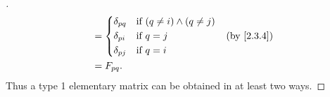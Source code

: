 \begin{proof}[]
\begin{align*}
		                                            & = \begin{dcases}
			                                                \delta_{p q} & \text{if } (q \neq i) \land (q \neq j) \\
			                                                \delta_{p i} & \text{if } q = j                       \\
			                                                \delta_{p j} & \text{if } q = i
		                                                \end{dcases}    &  & \by{2.3.4}    \\
		                                            & = F_{p q}.
	\end{align*}
	Thus a type 1 elementary matrix can be obtained in at least two ways.


\end{proof}
